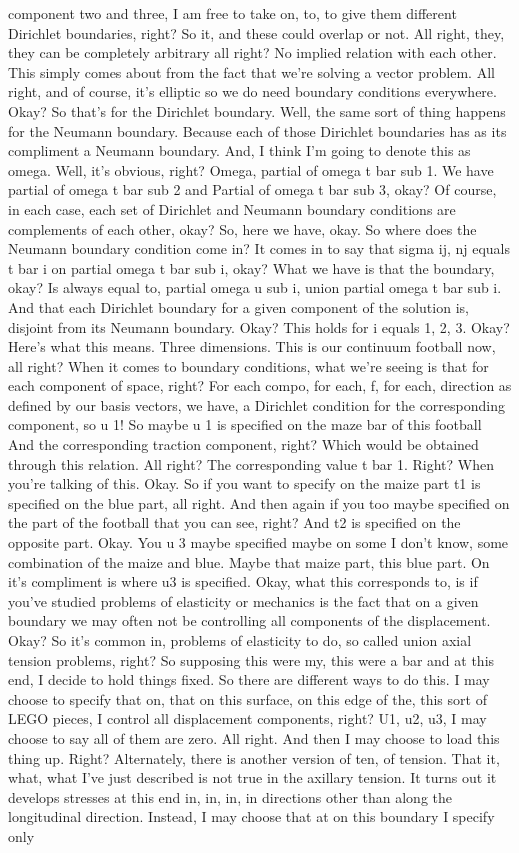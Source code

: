 \documentclass[10pt]{article}
\begin{document}
component two and three, I am free to take on, to, to give them different Dirichlet boundaries, right? So it, and these could overlap or not. All right, they, they can be completely arbitrary all right? No implied relation with each other. This simply comes about from the fact that we're solving a vector problem. All right, and of course, it's elliptic so we do need boundary conditions everywhere. Okay? So that's for the Dirichlet boundary. Well, the same sort of thing happens for the Neumann boundary. Because each of those Dirichlet boundaries has as its compliment a Neumann boundary. And, I think I'm going to denote this as omega. Well, it's obvious, right? Omega, partial of omega t bar sub 1. We have partial of omega t bar sub 2 and Partial of omega t bar sub 3, okay? Of course, in each case, each set of Dirichlet and Neumann boundary conditions are complements of each other, okay? So, here we have, okay. So where does the Neumann boundary condition come in? It comes in to say that sigma ij, nj equals t bar i on partial omega t bar sub i, okay? What we have is that the boundary, okay? Is always equal to, partial omega u sub i, union partial omega t bar sub i. And that each Dirichlet boundary for a given component of the solution is, disjoint from its Neumann boundary. Okay? This holds for i equals 1, 2, 3. Okay? Here's what this means.  Three dimensions. This is our continuum football now, all right? When it comes to boundary conditions, what we're seeing is that for each component of space, right? For each compo, for each, f, for each, direction as defined by our basis vectors, we have, a Dirichlet condition for the corresponding component, so u 1! So maybe u 1 is specified on the maze bar of this football And the corresponding traction component, right? Which would be obtained through this relation. All right? The corresponding value t bar 1. Right? When you're talking of this. Okay. So if you want to specify on the maize part t1 is specified on the blue part, all right. And then again if you too maybe specified on the part of the football that you can see, right? And t2 is specified on the opposite part. Okay. You u 3 maybe specified maybe on some I don't know, some combination of the maize and blue. Maybe that maize part, this blue part. On it's compliment is where u3 is specified. Okay, what this corresponds to, is if you've studied problems of elasticity or mechanics is the fact that on a given boundary we may often not be controlling all components of the displacement. Okay? So it's common in, problems of elasticity to do, so called union axial tension problems, right? So supposing this were my, this were a bar and at this end, I decide to hold things fixed. So there are different ways to do this. I may choose to specify that on, that on this surface, on this edge of the, this sort of LEGO pieces, I control all displacement components, right? U1, u2, u3, I may choose to say all of them are zero. All right. And then I may choose to load this thing up. Right? Alternately, there is another version of ten, of tension. That it, what, what I've just described is not true in the axillary tension. It turns out it develops stresses at this end in, in, in, in directions other than along the longitudinal direction. Instead, I may choose that at on this boundary I specify only 
\end{document}
